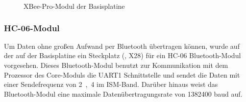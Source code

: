 \begin{figure}[htb]
    \centering
    \qquad
    \qquad
    \caption[XBee-Pro-Modul der Basisplatine]{XBee-Pro-Modul der \gls{Basisplatine}}
    \label{fig:basisplatine-xbee}
\end{figure}

\subsubsection{HC-06-Modul}
Um Daten ohne großen Aufwand per Bluetooth übertragen können, wurde auf der auf der \gls{Basisplatine} ein Steckplatz (, X28) für ein HC-06 Bluetooth-Modul vorgesehen. Dieses Bluetooth-Modul benutzt zur Kommunikation mit dem Prozessor des \gls{Core-Modul}s die UART1 Schnittstelle und sendet die Daten mit einer Sendefrequenz von \unit{2,4}{\giga\hertz} im ISM-Band. Darüber hinaus weist das Bluetooth-Modul eine maximale Datenübertragungsrate von 1382400 baud auf.

